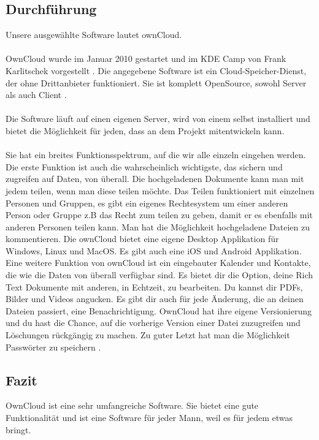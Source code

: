 \subsection{Durchführung}
Unsere ausgewählte Software lautet ownCloud. \\\\ OwnCloud wurde im Januar 2010 gestartet und im KDE Camp von Frank Karlitschek vorgestellt \cite{owncloud:history}. Die angegebene Software ist ein Cloud-Speicher-Dienst, der ohne Drittanbieter funktioniert. Sie ist komplett OpenSource, sowohl Server als auch Client \cite{owncloud:github}. \\\\ Die Software läuft auf einen eigenen Server, wird von einem selbst installiert und bietet die Möglichkeit für jeden, dass an dem Projekt mitentwickeln kann. \\\\ Sie hat ein breites Funktionsspektrum, auf die wir alle einzeln eingehen werden. Die erste Funktion ist auch die wahrscheinlich wichtigste, das sichern und zugreifen auf Daten, von überall. Die hochgeladenen Dokumente kann man mit jedem teilen, wenn man diese teilen möchte. Das Teilen funktioniert mit einzelnen Personen und Gruppen, es gibt ein eigenes Rechtesystem um einer anderen Person oder Gruppe z.B das Recht zum teilen zu geben, damit er es ebenfalls mit anderen Personen teilen kann. Man hat die Möglichkeit hochgeladene Dateien zu kommentieren. Die ownCloud bietet eine eigene Desktop Applikation für Windows, Linux und MacOS. Es gibt auch eine iOS und Android Applikation. Eine weitere Funktion von ownCloud ist ein eingebauter Kalender und Kontakte, die wie die Daten von überall verfügbar sind. Es bietet dir die Option, deine Rich Text Dokumente mit anderen, in Echtzeit, zu bearbeiten. Du kannst dir PDFs, Bilder und Videos angucken. Es gibt dir auch für jede Änderung, die an deinen Dateien passiert, eine Benachrichtigung. OwnCloud hat ihre eigene Versionierung und du hast die Chance, auf die vorherige Version einer Datei zuzugreifen und Löschungen rückgängig zu machen. Zu guter Letzt hat man die Möglichkeit Passwörter zu speichern \cite{owncloud:features}.

\subsection{Fazit}
OwnCloud ist eine sehr umfangreiche Software. Sie bietet eine gute Funktionalität und ist eine Software für jeder Mann, weil es für jedem etwas bringt. 
